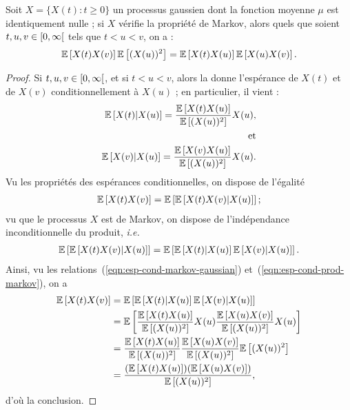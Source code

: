 \begin{lemme}
  \label{lm:triangle-decomp}
  Soit $X = \{X(t) : t\geq 0\}$ un processus gaussien dont la fonction
  moyenne $\mu$ est identiquement nulle ; si $X$ vérifie la propriété
  de Markov, alors quels que soient $t,u,v\in\left[0,\infty\right[$ tels
  que $t<u<v$, on a :
  \begin{align}
    \label{eqn:triangle-decomp}
    \mathbb{E}\left[X(t)X(v)\right]\mathbb{E}\left[(X(u))^2\right] = \mathbb{E}\left[X(t)X(u)\right]\mathbb{E}\left[X(u)X(v)\right].
  \end{align}
\end{lemme}
\begin{proof}
  Si $t,u,v\in\left[0,\infty\right[$, et si $t<u<v$, alors la
   donne l'espérance de $X(t)$ et de
  $X(v)$ conditionnellement à $X(u)$ ; en particulier, il vient :
  \begin{align}
    \label{eqn:esp-cond-markov-gaussian}
    \mathbb{E}\left[X(t)|X(u)\right] = \frac{\mathbb{E}\left[X(t)X(u)\right]}{\mathbb{E}\left[(X(u))^2\right]}X(u),\\
    \text{et}\\
    \mathbb{E}\left[X(v)|X(u)\right] = \frac{\mathbb{E}\left[X(v)X(u)\right]}{\mathbb{E}\left[(X(u))^2\right]}X(u).
  \end{align}
  Vu les propriétés des espérances conditionnelles, on dispose de
  l'égalité
  \begin{align*}
    \mathbb{E}\left[X(t)X(v)\right] = \mathbb{E}\left[\mathbb{E}\left[X(t)X(v)|X(u)\right]\right] ;
  \end{align*}
  vu que le processus $X$ est de Markov, on dispose de l'indépendance
  inconditionnelle du produit, \emph{i.e.}
  \begin{align}
    \label{eqn:esp-cond-prod-markov}
    \mathbb{E}\left[\mathbb{E}\left[X(t)X(v)|X(u)\right]\right] = \mathbb{E}\left[\mathbb{E}\left[X(t)|X(u)\right]\mathbb{E}\left[X(v)|X(u)\right]\right].
  \end{align}
  Ainsi, vu les relations~(\ref{eqn:esp-cond-markov-gaussian})
  et~(\ref{eqn:esp-cond-prod-markov}), on a
  \begin{align*}
    \mathbb{E}\left[X(t)X(v)\right] &= \mathbb{E}\left[\mathbb{E}\left[X(t)|X(u)\right]\mathbb{E}\left[X(v)|X(u)\right]\right] \\
                   &= \mathbb{E}\left[\frac{\mathbb{E}\left[X(t)X(u)\right]}{\mathbb{E}\left[(X(u))^2\right]}X(u)\frac{\mathbb{E}\left[X(u)X(v)\right]}{\mathbb{E}\left[(X(u))^2\right]}X(u)\right]\\
                   &= \frac{\mathbb{E}\left[X(t)X(u)\right]}{\mathbb{E}\left[(X(u))^2\right]}\frac{\mathbb{E}\left[X(u)X(v)\right]}{\mathbb{E}\left[(X(u))^2\right]}\mathbb{E}\left[(X(u))^2\right]\\
                   &= \frac{(\mathbb{E}\left[X(t)X(u)\right])(\mathbb{E}\left[X(u)X(v)\right])}{\mathbb{E}\left[(X(u))^2\right]},
  \end{align*}
  d'où la conclusion.
\end{proof}

